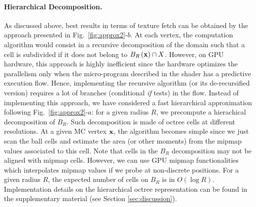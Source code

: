 \documentclass{llncs}
\begin{document}
\paragraph{Hierarchical Decomposition.}  As discussed above, best
results in terms of texture fetch can be obtained by the approach
presented in Fig.~\ref{fig:approx2}-$b$. At each vertex, the
computation algorithm would consist in a recursive decomposition of
the domain such that a cell is subdivided if it does not belong to
$B_{R}\left(\mathbf{x}\right)\cap X$. However, on GPU hardware, this approach is
highly inefficient since the hardware optimizes the parallelism only
when the micro-program described in the shader has a predictive
execution flow. Hence, implementing the recursive algorithm (or its
de-recursified version) requires a lot of branches (conditional
\emph{if} tests) in the flow. Instead of implementing this approach,
we have considered a fast hierarchical approximation following
Fig.~\ref{fig:approx2}-$a$: for a given radius $R$, we precompute a
hierachical decomposition of $B_R$. Such decomposition is made of
octree cells at different resolutions. At a given MC vertex $\mathbf{x}$, the
algorithm becomes simple since we just scan the ball cells and
estimate the area (or other moments) from the mipmap values associated
to this cell. Note that cells in the $B_R$ decomposition may not be
aligned with mipmap cells. However, we can use GPU mipmap
functionalities which interpolates mipmap values if we probe at
non-discrete positions. For a given radius $R$, the expected number of
cells on $B_R$ is in $O(\log{R})$. Implementation details on the
hierarchical octree representation can be found in the supplementary
material (see Section \ref{sec:discussion}).


\end{document}
